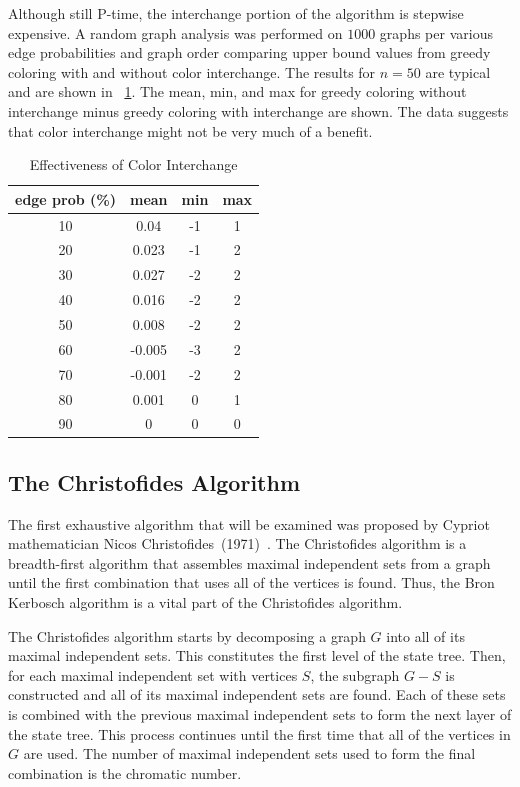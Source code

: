Although still P-time, the interchange portion of the algorithm is stepwise expensive.  A random graph analysis was
performed on \(1000\) graphs per various edge probabilities and graph order comparing upper bound values from
greedy coloring with and without color interchange.  The results for \(n=50\) are typical and are shown in
\tablename~\ref{tab:greedy}.  The mean, min, and max for greedy coloring without interchange minus greedy coloring
with interchange are shown.  The data suggests that color interchange might not be very much of a benefit.

\begin{table}[H]
  \centering
  \caption{Effectiveness of Color Interchange}
  \label{tab:greedy}
  \begin{tabular}{|c|c|c|c|}
    \hline
    edge prob (\%) & mean & min & max \\
    \hline
    10 & 0.04 & -1 & 1 \\
    \hline
    20 & 0.023 & -1 & 2 \\
    \hline
    30 & 0.027 & -2 & 2 \\
    \hline
    40 & 0.016 & -2 & 2 \\
    \hline
    50 & 0.008 & -2 & 2 \\
    \hline
    60 & -0.005 & -3 & 2 \\
    \hline
    70 & -0.001 & -2 & 2 \\
    \hline
    80 & 0.001 & 0 & 1 \\
    \hline
    90 & 0 & 0 & 0 \\
    \hline
  \end{tabular}
\end{table}

\subsection{The Christofides Algorithm}\label{sec:sub:christofides}

The first exhaustive algorithm that will be examined was proposed by Cypriot mathematician Nicos
Christofides~(1971)~\cite{christofides}.  The Christofides algorithm is a breadth-first algorithm that assembles
maximal independent sets from a graph until the first combination that uses all of the vertices is found.  Thus,
the Bron Kerbosch algorithm is a vital part of the Christofides algorithm.

The Christofides algorithm starts by decomposing a graph \(G\) into all of its maximal independent sets.  This
constitutes the first level of the state tree.  Then, for each maximal independent set with vertices \(S\), the
subgraph \(G-S\) is constructed and all of its maximal independent sets are found.  Each of these sets is combined
with the previous maximal independent sets to form the next layer of the state tree.  This process continues until
the first time that all of the vertices in \(G\) are used.  The number of maximal independent sets used to form the
final combination is the chromatic number.

